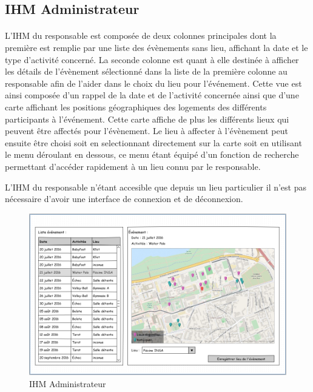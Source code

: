 \documentclass[a4paper,11pt]{article}
\begin{document}
\pagebreak
\subsection{IHM Administrateur}

\paragraph{}
L'IHM du responsable est composée de deux colonnes principales dont la première est remplie par une liste des évènements sans lieu, affichant la date et le type d'activité concerné. La seconde colonne est quant à elle destinée à afficher les détails de l'évènement sélectionné dans la liste de la première colonne au responsable afin de l'aider dans le choix du lieu pour l'événement. Cette vue est ainsi composée d'un rappel de la date et de l'activité concernée ainsi que d'une carte affichant les positions géographiques des logements des différents participants à l'événement. Cette carte affiche de plus les différents lieux qui peuvent être affectés pour l'évènement. Le lieu à affecter à l'évènement peut ensuite être choisi soit en selectionnant directement sur la carte soit en utilisant le menu déroulant en dessous, ce menu étant équipé d'un fonction de recherche permettant d'accéder rapidement à un lieu connu par le responsable.

L'IHM du responsable n'étant accesible que depuis un lieu particulier il n'est pas nécessaire d'avoir une interface de connexion et de déconnexion.

\begin{figure}[H]
  \begin{center}
    \includegraphics[width=15cm]{../../IHM/IHM_responsable.png}
    \caption{IHM Administrateur}
  \end{center}
\end{figure}
\end{document}
